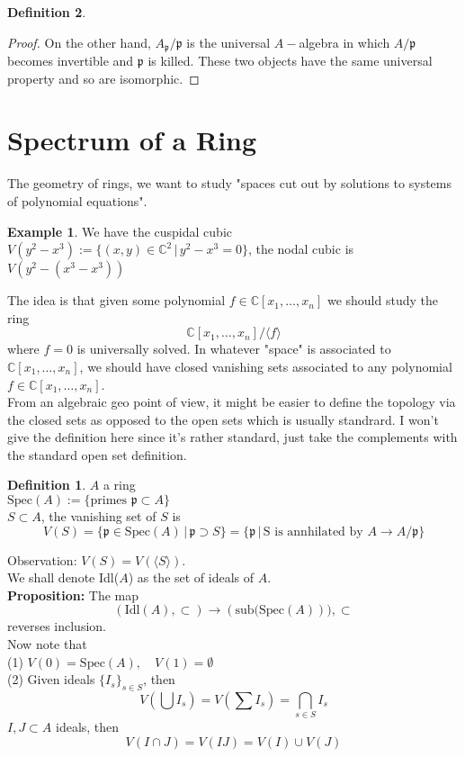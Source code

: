 \documentclass{article}
\theoremstyle{definition}
\newtheorem{example}{Example}[section]
\theoremstyle{definition}
\newtheorem{definition}{Definition}[section]
\theoremstyle{remark}
\newcommand{\C}{\mathbb{C}}
\newcommand{\mk}[1]{\mathfrak{#1}}
\newcommand{\un}{\cup}
\newcommand{\ic}{\cap}
\begin{document}
\begin{definition}
\begin{proof}
	On the other hand, $A_{\mk{p}}/\mk{p}$ is the universal $A-$algebra in which $A/\mk{p}$ becomes invertible and $\mk{p}$ is killed. 
	These two objects have the same universal property and so are isomorphic.
\end{proof}

 
\section{Spectrum of a Ring}

The geometry of rings, we want to study "spaces cut out by solutions to systems of polynomial equations".
\begin{example}
We have the cuspidal cubic	$V(y^2 - x^3) := \{(x,y) \in \C^2 \,|\, y^2 - x^3 = 0\}$, the nodal cubic is $V(y^2 - (x^3 - x^3))$
\end{example}

The idea is that given some polynomial $f \in \C[x_1, \dots, x_n]$ we should study the ring
\[\C[x_1, \dots, x_n]/\langle f \rangle\]
where $f = 0$ is universally solved.
In whatever "space" is associated to $\C[x_1, \dots, x_n]$, we should have closed vanishing sets associated to any polynomial $f \in \C[x_1, \dots, x_n]$.\\

From an algebraic geo point of view, it might be easier to define the topology via the closed sets as opposed to the open sets which is usually standrard.
I won't give the definition here since it's rather standard, just take the complements with the standard open set definition.\\

\begin{definition}
	$A$ a ring \\
	\indent $\text{Spec}(A) := \{\text{primes } \mk{p} \subset A\}$\\
	\indent $S \subset A$, the vanishing set of $S$ is \[V(S) = \{\mk{p} \in \text{Spec}(A) \, |\, \mk{p} \supset S\} = \{\mk{p} \, |\, \text{S is annhilated by  $A \to A/\mk{p}$
}\}\]
\end{definition}

Observation: $V(S) = V(\langle S \rangle)$.\\
We shall denote Idl($A$) as the set of ideals of $A$.\\
\textbf{Proposition:} The map 
\[(\text{Idl}(A), \subset) \to (\text{sub(Spec}(A))), \subset\]
reverses inclusion. \\

Now note that \\
\indent (1) $V(0) = \text{Spec}(A), \quad V(1) = \emptyset$\\
\indent (2) Given ideals $\{I_s\}_{s\in S}$, then 
\[V(\bigcup I_s) = V(\sum I_s) = \bigcap_{s \in S} I_s\]
\indent $I,J \subset A$ ideals, then 
\[V(I \ic J) = V(IJ) = V(I) \un V(J)\]


\end{definition}
\end{document}

